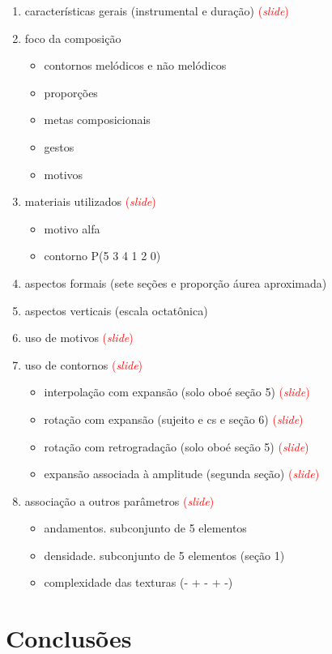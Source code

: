 \documentclass[12pt,a4paper]{article}
\newcommand{\slide}{\textcolor{red}{(\textit{slide})}}
\begin{document}
\begin{enumerate}
\item características gerais (instrumental e duração) \slide{}
\item foco da composição
  \begin{itemize}
  \item contornos melódicos e não melódicos
  \item proporções
  \item metas composicionais
  \item gestos
  \item motivos
  \end{itemize}
\item materiais utilizados \slide{}
  \begin{itemize}
  \item motivo alfa
  \item contorno P(5 3 4 1 2 0)
  \end{itemize}
\item aspectos formais (sete seções e proporção áurea aproximada)
\item aspectos verticais (escala octatônica)
\item uso de motivos \slide{}
\item uso de contornos \slide{}
  \begin{itemize}
  \item interpolação com expansão (solo oboé seção 5) \slide{}
  \item rotação com expansão (sujeito e cs e seção 6) \slide{}
  \item rotação com retrogradação (solo oboé seção 5) \slide{}
  \item expansão associada à amplitude (segunda seção) \slide{}
  \end{itemize}
\item associação a outros parâmetros \slide{}
  \begin{itemize}
  \item andamentos. subconjunto de 5 elementos
  \item densidade. subconjunto de 5 elementos (seção 1)
  \item complexidade das texturas (- + - + -)
  \end{itemize}
\end{enumerate}

\section{Conclusões}
\end{document}
